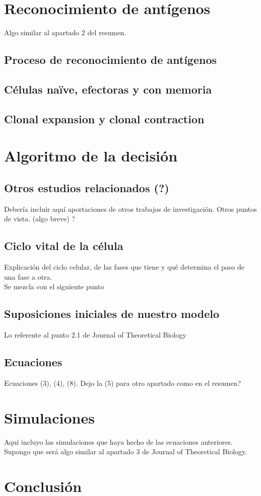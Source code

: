 \documentclass{article}
\begin{document}
\section{Reconocimiento de antígenos}
    Algo similar al apartado 2 del resumen.
    \subsection{Proceso de reconocimiento de antígenos}
    \subsection{Células naïve, efectoras y con memoria}
    \subsection{Clonal expansion y clonal contraction}
    
\section{Algoritmo de la decisión}
    
        
    \subsection{Otros estudios relacionados (?)}
        Debería incluir aquí aportaciones de otros trabajos de investigación. Otros puntos de vista. (algo breve) ?
        
    \subsection{Ciclo vital de la célula}
        Explicación del ciclo celular, de las fases que tiene y qué determina el paso de una fase a otra.
        \\
        Se mezcla con el siguiente punto
    \subsection{Suposiciones iniciales de nuestro modelo}
        Lo referente al punto 2.1 de Journal of Theoretical Biology
    \subsection{Ecuaciones}
        Ecuaciones (3), (4), (8).
        Dejo la (5) para otro apartado como en el resumen?
    
\section{Simulaciones}
    Aquí incluyo las simulaciones que haya hecho de las ecuaciones anteriores. Supongo que será algo similar al apartado 3 de Journal of Theoretical Biology.
    
\section{Conclusión}
\end{document}
